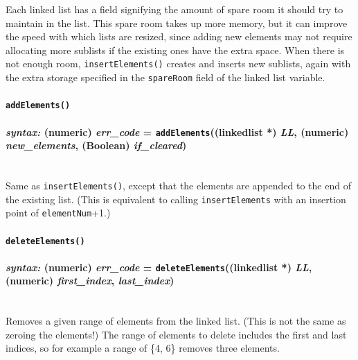 \documentclass{article}
\begin{document}
Each linked list has a field signifying the amount of spare room it should try to maintain in the list.  This spare room takes up more memory, but it can improve the speed with which lists are resized, since adding new elements may not require allocating more sublists if the existing ones have the extra space.  When there is not enough room, \texttt{insertElements()} creates and inserts new sublists, again with the extra storage specified in the \texttt{spareRoom} field of the linked list variable. \\




\paragraph{\texttt{addElements()}\\\\
\normalfont \emph{syntax: } (numeric) \emph{err\_code} = \texttt{addElements}((linkedlist *) \emph{LL}, (numeric) \emph{new\_elements}, (Boolean) \emph{if\_cleared})\\\\}

Same as \texttt{insertElements()}, except that the elements are appended to the end of the existing list.  (This is equivalent to calling \texttt{insertElements} with an insertion point of \texttt{elementNum}+1.) \\




\paragraph{\texttt{deleteElements()}\\\\
\normalfont \emph{syntax: } (numeric) \emph{err\_code} = \texttt{deleteElements}((linkedlist *) \emph{LL}, (numeric) \emph{first\_index}, \emph{last\_index})\\\\} 

Removes a given range of elements from the linked list.  (This is not the same as zeroing the elements!)  The range of elements to delete includes the first and last indices, so for example a range of \{4, 6\} removes three elements.\\
\end{document}
